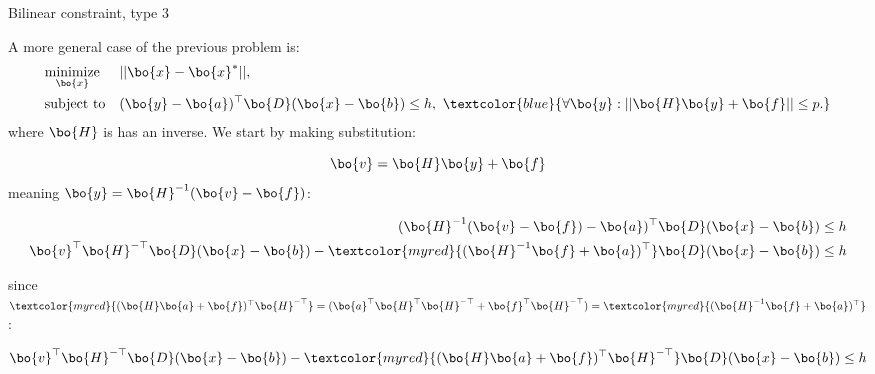 \documentclass{beamer}
\begin{document}
\begin{frame}{Bilinear constraint, type 3}
\begin{flushleft}

A more general case of the previous problem is:
%
\begin{equation}
\begin{aligned}
& \underset{\bo{x}}{\text{minimize}} 
& & ||\bo{x} - \bo{x}^*||, \\
& \text{subject to}
& & (\bo{y} - \bo{a})^\top \bo{D} (\bo{x} - \bo{b}) \leq h, \ 
\textcolor{blue}{
	\forall \bo{y} : ||\bo{H}\bo{y} + \bo{f}|| \leq p.} 
\end{aligned}
\end{equation}
%
where $\bo{H}$ is has an inverse. We start by making substitution:

\begin{equation}
    \bo{v} = \bo{H}\bo{y} + \bo{f}
\end{equation}
%
meaning $\bo{y} = \bo{H}^{-1}(\bo{v} -\bo{f})$:

\begin{align}
    (\bo{H}^{-1}(\bo{v} -\bo{f}) - \bo{a})^\top \bo{D} (\bo{x} - \bo{b}) \leq h \\
    \bo{v}^\top \bo{H}^{-\top} \bo{D} (\bo{x} - \bo{b}) - \textcolor{myred}{(\bo{H}^{-1}\bo{f} + \bo{a})^\top} \bo{D} (\bo{x} - \bo{b}) \leq h
\end{align}


{\small
since $\textcolor{myred}{(\bo{H}\bo{a} + \bo{f})^\top \bo{H}^{-\top}} = (\bo{a}^\top\bo{H}^\top \bo{H}^{-\top}   + \bo{f}^\top \bo{H}^{-\top})  = \textcolor{myred}{(\bo{H}^{-1}\bo{f} + \bo{a})^\top}$:}

\begin{align}
\bo{v}^\top \bo{H}^{-\top} \bo{D} (\bo{x} - \bo{b}) - \textcolor{myred}{(\bo{H}\bo{a} + \bo{f})^\top \bo{H}^{-\top}}\bo{D} (\bo{x} - \bo{b}) \leq h
\end{align}

 
\end{flushleft}
\end{frame}
\end{document}
